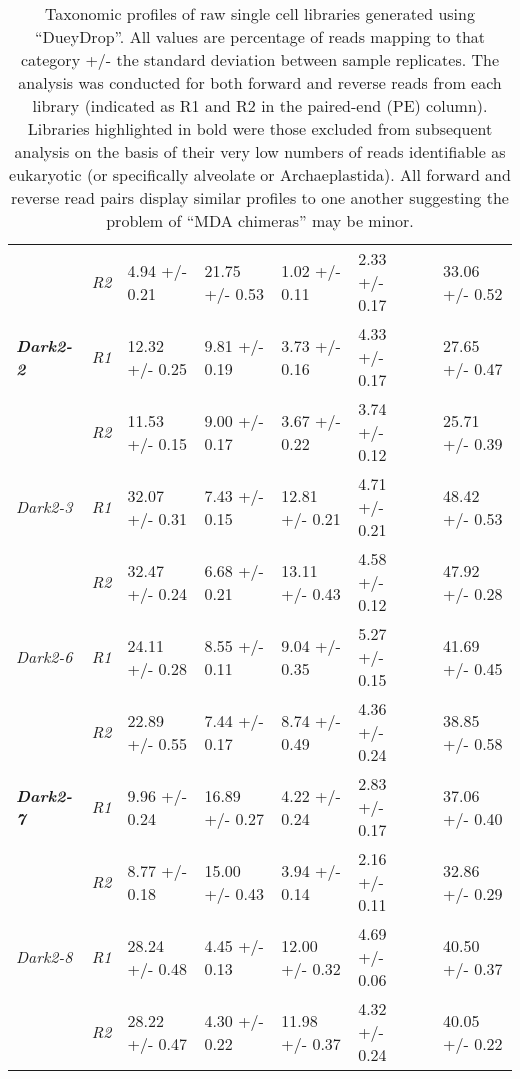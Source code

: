 \begin{table}[h!]
{\begin{tabular}{|l||l|l|l|l|l|l|l|}
                              & \textit{R2}                   & 4.94 +/- 0.21      & 21.75 +/- 0.53    & 1.02 +/- 0.11      & 2.33 +/- 0.17          &  & 33.06 +/- 0.52      \\
         \textbf{\textit{Dark2-2}}     & \textit{R1}          & 12.32 +/- 0.25     & 9.81 +/- 0.19     & 3.73 +/- 0.16      & 4.33 +/- 0.17          &  & 27.65 +/- 0.47      \\ 
                              & \textit{R2}                   & 11.53 +/- 0.15     & 9.00 +/- 0.17     & 3.67 +/- 0.22      & 3.74 +/- 0.12          &  & 25.71 +/- 0.39      \\
         \textit{Dark2-3}     & \textit{R1}                   & 32.07 +/- 0.31     & 7.43 +/- 0.15     & 12.81 +/- 0.21     & 4.71 +/- 0.21          &  & 48.42 +/- 0.53      \\ 
                              & \textit{R2}                   & 32.47 +/- 0.24     & 6.68 +/- 0.21     & 13.11 +/- 0.43     & 4.58 +/- 0.12          &  & 47.92 +/- 0.28      \\
         \textit{Dark2-6}     & \textit{R1}                   & 24.11 +/- 0.28     & 8.55 +/- 0.11     & 9.04 +/- 0.35      & 5.27 +/- 0.15          &  & 41.69 +/- 0.45      \\ 
                              & \textit{R2}                   & 22.89 +/- 0.55     & 7.44 +/- 0.17     & 8.74 +/- 0.49      & 4.36 +/- 0.24          &  & 38.85 +/- 0.58      \\
         \textbf{\textit{Dark2-7}}     & \textit{R1}          & 9.96 +/- 0.24      & 16.89 +/- 0.27    & 4.22 +/- 0.24      & 2.83 +/- 0.17          &  & 37.06 +/- 0.40      \\ 
                              & \textit{R2}                   & 8.77 +/- 0.18      & 15.00 +/- 0.43    & 3.94 +/- 0.14      & 2.16 +/- 0.11          &  & 32.86 +/- 0.29      \\
         \textit{Dark2-8}     & \textit{R1}                   & 28.24 +/- 0.48     & 4.45 +/- 0.13     & 12.00 +/- 0.32     & 4.69 +/- 0.06          &  & 40.50 +/- 0.37      \\ 
                              & \textit{R2}                   & 28.22 +/- 0.47     & 4.30 +/- 0.22     & 11.98 +/- 0.37     & 4.32 +/- 0.24          &  & 40.05 +/- 0.22      \\
         \hline
 \end{tabular}}
     \caption[DueyDrop Taxonomic Profile Summary]{Taxonomic profiles of raw single cell libraries generated using ``DueyDrop''. All values are percentage of reads mapping to that category +/- the standard deviation between sample replicates.  
         The analysis was conducted for both forward and reverse reads from each library (indicated as R1 and R2 in the paired-end (PE) column).
         Libraries highlighted in bold were those excluded from subsequent analysis on the basis of their very low numbers of reads identifiable as 
 eukaryotic (or specifically alveolate or Archaeplastida). All forward and reverse read pairs display similar profiles to one another suggesting
 the problem of ``MDA chimeras'' may be minor.}
 \label{tab:sct_duey}
\end{table}

